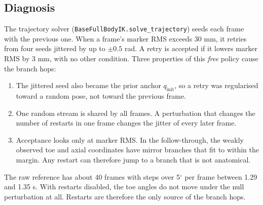 \documentclass[11pt,a4paper]{article}
\begin{document}
\subsection{Diagnosis}
The trajectory solver (\texttt{BaseFullBodyIK.solve\_trajectory}) seeds each
frame with the previous one. When a frame's marker RMS exceeds 30 mm, it
retries from four seeds jittered by up to $\pm0.5$ rad. A retry is accepted
if it lowers marker RMS by 3 mm, with no other condition. Three properties of
this \emph{free} policy cause the branch hops:
\begin{enumerate}
\item The jittered seed also became the prior anchor $q_\mathrm{init}$, so a
retry was regularised toward a random pose, not toward the previous frame.
\item One random stream is shared by all frames. A perturbation that changes
the number of restarts in one frame changes the jitter of every later frame.
\item Acceptance looks only at marker RMS. In the follow-through, the
weakly observed toe and axial coordinates have mirror branches that fit to
within the margin. Any restart can therefore jump to a branch that is not
anatomical.
\end{enumerate}
The raw reference has about 40 frames with steps over 5$^\circ$ per frame
between 1.29 and 1.35 s. With restarts disabled, the toe angles do not move
under the null perturbation at all. Restarts are therefore the only source of
the branch hops.
\end{document}
